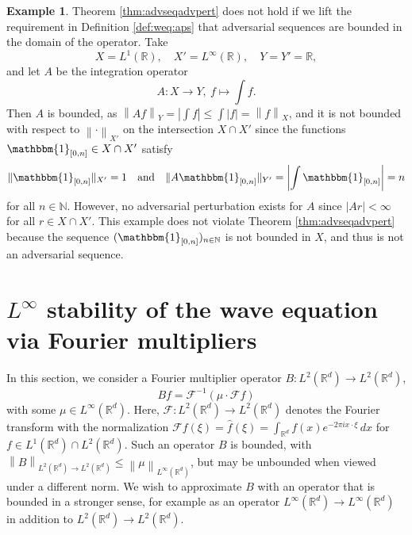 \documentclass{article}
\theoremstyle{definition}
\newtheorem{example}[theorem]{Example}
\newcommand{\N}{\mathbb{N}}
\newcommand{\R}{\mathbb{R}}
\newcommand{\smallnorm}[1]{\lVert#1\rVert}
\newcommand{\norm}[1]{\left\lVert#1\right\rVert}
\newcommand{\abs}[1]{\left\lvert#1\right\rvert}
\newcommand{\characteristic}[1]{\mathbbm{1}_{#1}}
\newcommand{\fourier}{\mathcal{F}}
\begin{document}
\begin{example}
\label{ex:domainchangeintegral}
    Theorem \ref{thm:advseqadvpert}
    does not hold if we lift the requirement in Definition \ref{def:weq:aps} 
    that adversarial sequences are bounded in the domain of the operator.
    Take
    \begin{equation*}
    X=L^1(\R),\quad
    X'=L^\infty(\R),\quad
    Y=Y'=\R,
    \end{equation*}
    and let \(A\) be the integration operator
    \begin{equation*}
        A\colon X\to Y,\ f\mapsto \int f.
    \end{equation*}
    Then \(A\) is bounded, as \(\norm{Af}_Y=\abs{\int f}\leq \int\abs{f}=\norm{f}_X\),
    and 
    it is not bounded with respect to \(\norm{\cdot}_{X'}\) on the intersection \(X\cap X'\)
    since the functions \(\characteristic{[0,n]}\in X\cap X'\) satisfy 
    \begin{equation*}
    \smallnorm{\characteristic{[0,n]}}_{X'}=1
    \quad\text{and}\quad
    \smallnorm{A\characteristic{[0,n]}}_{Y'}=\abs{\int\characteristic{[0,n]}}=n   
    \end{equation*}
    for all \(n\in \N\).
    However, no adversarial perturbation exists for \(A\) since \(\abs{Ar}<\infty\) for all \(r\in X\cap X'\).
    This example does not violate Theorem \ref{thm:advseqadvpert} because the sequence \((\characteristic{[0,n]})_{n\in\N}\) is not bounded in \(X\), and thus is not an adversarial sequence.
\end{example}


\section{\texorpdfstring{$L^\infty$}{L infty} stability of the wave equation  via  Fourier multipliers}\label{sec:wave}

In this section, we consider a Fourier multiplier operator 
\(B\colon L^2(\R^d)\to L^2(\R^d)\),
\begin{equation}\label{eq:multipliermu}
    Bf = 
    \fourier^{-1}\left(
    \mu\cdot \fourier{f}
    \right)
\end{equation}
with some \(\mu\in L^\infty(\R^d)\). Here, $\mathcal F\colon L^2(\R^d)\to L^2(\R^d)$ denotes the Fourier transform with the normalization $\mathcal{F}f(\xi)=\widehat f(\xi)=\int_{\R^d} f(x)e^{-2\pi i x\cdot \xi}\,dx$ for $f\in L^1(\R^d)\cap L^2(\R^d)$.
Such an operator $B$ is bounded, with \(\norm{B}_{L^2(\R^d)\to L^2(\R^d)}\leq \norm{\mu}_{L^\infty(\R^d)}\),
but may be unbounded when viewed under a different norm.
We wish to approximate \(B\) with an operator that is bounded in a stronger sense,
for example as an operator \(L^\infty(\R^d)\to L^\infty(\R^d)\) in addition to \(L^2(\R^d)\to L^2(\R^d)\).
\end{document}
